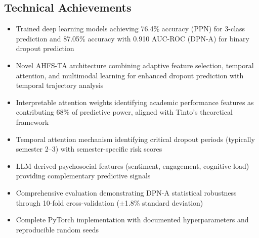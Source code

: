 \subsection{Technical Achievements}
\begin{itemize}
\item Trained deep learning models achieving 76.4\% accuracy (PPN) for 3-class prediction and 87.05\% accuracy with 0.910 AUC-ROC (DPN-A) for binary dropout prediction
\item Novel AHFS-TA architecture combining adaptive feature selection, temporal attention, and multimodal learning for enhanced dropout prediction with temporal trajectory analysis
\item Interpretable attention weights identifying academic performance features as contributing 68\% of predictive power, aligned with Tinto's theoretical framework
\item Temporal attention mechanism identifying critical dropout periods (typically semester 2--3) with semester-specific risk scores
\item LLM-derived psychosocial features (sentiment, engagement, cognitive load) providing complementary predictive signals
\item Comprehensive evaluation demonstrating DPN-A statistical robustness through 10-fold cross-validation ($\pm$1.8\% standard deviation)
\item Complete PyTorch implementation with documented hyperparameters and reproducible random seeds
\end{itemize}

